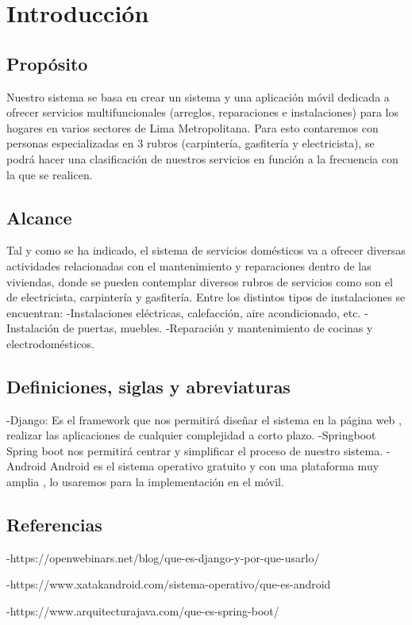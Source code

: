 \chapter{Introducción}

\section{Propósito}
Nuestro sistema se basa en crear un sistema y una aplicación móvil dedicada a ofrecer servicios multifuncionales (arreglos, reparaciones e instalaciones) para los hogares en varios sectores de Lima Metropolitana. Para esto contaremos con personas especializadas en 3 rubros (carpintería, gasfitería y electricista), se podrá hacer una clasificación de nuestros servicios en función a la frecuencia con la que se realicen.
\section{Alcance}
Tal y como se ha indicado, el sistema de servicios domésticos va a ofrecer diversas actividades relacionadas con el mantenimiento y reparaciones dentro de las viviendas, donde se pueden contemplar diversos rubros de servicios como son el de electricista, carpintería y gasfitería.
Entre los distintos tipos de instalaciones se encuentran:
-Instalaciones eléctricas, calefacción, aire acondicionado, etc.
-Instalación de puertas, muebles.
-Reparación y mantenimiento de cocinas y electrodomésticos.


\section{Definiciones, siglas y abreviaturas}
-Django:
Es el framework que nos permitirá diseñar el sistema en la página web , realizar las aplicaciones de cualquier complejidad a corto plazo.
-Springboot
Spring boot nos permitirá centrar y simplificar el proceso de nuestro sistema.
-Android
Android es el sistema operativo gratuito y con una plataforma muy amplia , lo usaremos para la implementación en el móvil.


\section{Referencias}
-https://openwebinars.net/blog/que-es-django-y-por-que-usarlo/ \par
-https://www.xatakandroid.com/sistema-operativo/que-es-android \par
-https://www.arquitecturajava.com/que-es-spring-boot/
